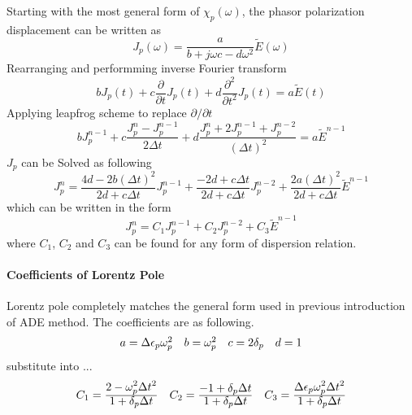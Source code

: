 Starting with the most general form of $\chi_p(\omega)$, the phasor polarization displacement can be written
as
\begin{equation}
  J_p(\omega) = \frac{a}{b + j\omega c - d\omega^2}\widetilde{E}(\omega)
\end{equation}
Rearranging and performming inverse Fourier transform 
\begin{equation}
  bJ_p(t) + c \frac{\partial}{\partial t}J_p(t) + d \frac{\partial ^2}{\partial t^2}J_p(t) = a\widetilde{E}(t)
\end{equation}
Applying leapfrog scheme to replace $\partial/\partial t$
\begin{equation}
  bJ_p^{n-1} + c \frac{J_p^n - J_p^{n-1}}{2\Delta t} + d \frac{J_p^n + 2J_p^{n-1} + J_p^{n-2}}{(\Delta t)^2} = a\widetilde{E}^{n-1}
\end{equation}
$J_p$ can be Solved as following
\begin{equation}
  J_p^n = \frac{4d-2b(\Delta t)^2}{2d+c\Delta t}J_p^{n-1} + \frac{-2d+c\Delta t}{2d+c\Delta t}J_p^{n-2} + \frac{2a(\Delta t)^2}{2d+c\Delta t}\widetilde{E}^{n-1}
\end{equation}
which can be written in the form 
\begin{equation}\label{eq:polarized_displacement}
  J_p^n = C_1 J_p^{n-1} + C_2 J_p^{n-2} + C_3 \widetilde{E}^{n-1}
\end{equation}
where $C_1$, $C_2$ and $C_3$ can be found for any form of dispersion relation.


\paragraph{\msjh Coefficients of Lorentz Pole}
Lorentz pole completely matches the general form used in previous introduction of ADE method. The coefficients are as
following.
\begin{equation*}
  \begin{array}{@{}llll@{}}
    a = \Delta\epsilon_p\omega_p^2 &
    b = \omega_p^2 &
    c = 2\delta_p &
    d = 1
  \end{array}
\end{equation*}
substitute into ...
\begin{gather*}
  \begin{array}{@{}lll@{}}
    C_1 = \frac{\displaystyle 2-\omega_p^2\Delta t^2}{\displaystyle 1+\delta_p\Delta t} &
    C_2 = \frac{\displaystyle -1 + \delta_p\Delta t}{\displaystyle 1+\delta_p\Delta t} &
    C_3 = \frac{\displaystyle \Delta\epsilon_p\omega_p^2\Delta t^2}{\displaystyle 1+\delta_p\Delta t}
  \end{array}
\end{gather*}


